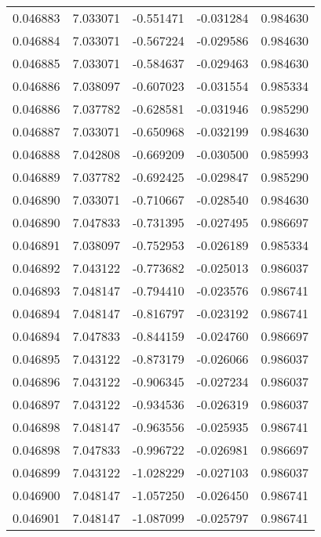 \begin{tabular}{lrrrr}
0.046883    &  7.033071 & -0.551471 & -0.031284 &             0.984630 \\
0.046884    &  7.033071 & -0.567224 & -0.029586 &             0.984630 \\
0.046885    &  7.033071 & -0.584637 & -0.029463 &             0.984630 \\
0.046886    &  7.038097 & -0.607023 & -0.031554 &             0.985334 \\
0.046886    &  7.037782 & -0.628581 & -0.031946 &             0.985290 \\
0.046887    &  7.033071 & -0.650968 & -0.032199 &             0.984630 \\
0.046888    &  7.042808 & -0.669209 & -0.030500 &             0.985993 \\
0.046889    &  7.037782 & -0.692425 & -0.029847 &             0.985290 \\
0.046890    &  7.033071 & -0.710667 & -0.028540 &             0.984630 \\
0.046890    &  7.047833 & -0.731395 & -0.027495 &             0.986697 \\
0.046891    &  7.038097 & -0.752953 & -0.026189 &             0.985334 \\
0.046892    &  7.043122 & -0.773682 & -0.025013 &             0.986037 \\
0.046893    &  7.048147 & -0.794410 & -0.023576 &             0.986741 \\
0.046894    &  7.048147 & -0.816797 & -0.023192 &             0.986741 \\
0.046894    &  7.047833 & -0.844159 & -0.024760 &             0.986697 \\
0.046895    &  7.043122 & -0.873179 & -0.026066 &             0.986037 \\
0.046896    &  7.043122 & -0.906345 & -0.027234 &             0.986037 \\
0.046897    &  7.043122 & -0.934536 & -0.026319 &             0.986037 \\
0.046898    &  7.048147 & -0.963556 & -0.025935 &             0.986741 \\
0.046898    &  7.047833 & -0.996722 & -0.026981 &             0.986697 \\
0.046899    &  7.043122 & -1.028229 & -0.027103 &             0.986037 \\
0.046900    &  7.048147 & -1.057250 & -0.026450 &             0.986741 \\
0.046901    &  7.048147 & -1.087099 & -0.025797 &             0.986741 \\

\end{tabular}
